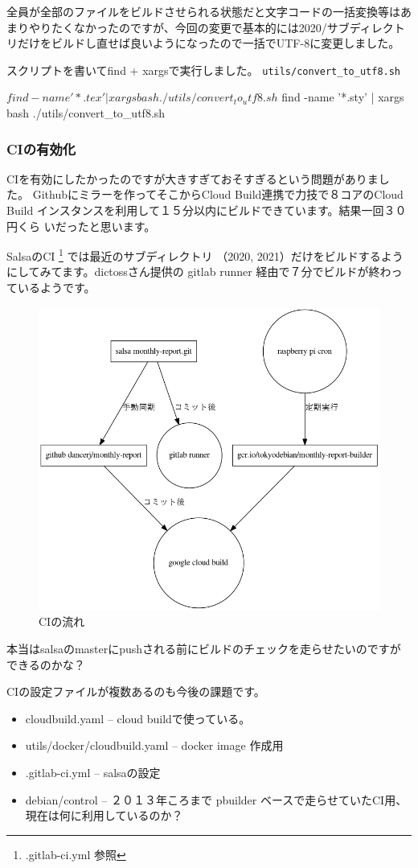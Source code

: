 \documentclass[mingoth,a4paper]{jsarticle}
\begin{document}
全員が全部のファイルをビルドさせられる状態だと文字コードの一括変換等はあ
まりやりたくなかったのですが、今回の変更で基本的には2020/サブディレクト
リだけをビルドし直せば良いようになったので一括でUTF-8に変更しました。

スクリプトを書いてfind + xargsで実行しました。
\verb!utils/convert_to_utf8.sh!

\begin{commandline}
$ find -name '*.tex' | xargs bash ./utils/convert_to_utf8.sh
$ find -name '*.sty' | xargs bash ./utils/convert_to_utf8.sh
\end{commandline}

\subsubsection{CIの有効化}

CIを有効にしたかったのですが大きすぎておそすぎるという問題がありました。
Githubにミラーを作ってそこからCloud Build連携で力技で８コアのCloud Build
インスタンスを利用して１５分以内にビルドできています。結果一回３０円くら
いだったと思います。

SalsaのCI \footnote{.gitlab-ci.yml 参照} では最近のサブディレクトリ
（2020, 2021）だけをビルドするようにしてみてます。dictossさん提供の
gitlab runner 経由で７分でビルドが終わっているようです。

\begin{figure}[h]
\begin{center}
\includegraphics[keepaspectratio,width=0.5\hsize]{image202011/debci.png}
\end{center}
\caption{CIの流れ}
\label{fig:monthlyreport-ci-configuration}
\end{figure}

本当はsalsaのmasterにpushされる前にビルドのチェックを走らせたいのですが
できるのかな？

CIの設定ファイルが複数あるのも今後の課題です。

\begin{itemize}
 \item cloudbuild.yaml -- cloud buildで使っている。
 \item utils/docker/cloudbuild.yaml -- docker image 作成用
 \item .gitlab-ci.yml -- salsaの設定
 \item debian/control -- ２０１３年ころまで pbuilder ベースで走らせていたCI用、現在は何に利用しているのか？
\end{itemize}
\end{document}
